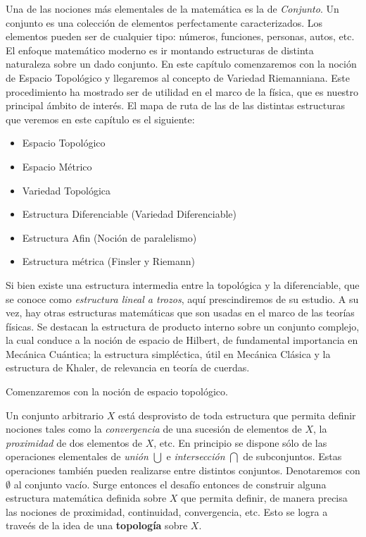 \label{s:3.1}

Una  de  las  nociones m\'as  elementales  de  la  matem\'atica  es la  de  {\it
  Conjunto}.  Un   conjunto  es  una  colecci\'on   de  elementos  perfectamente
caracterizados.  Los   elementos  pueden  ser  de   cualquier  tipo:  n\'umeros,
funciones, personas, autos, etc. El  enfoque matem\'atico moderno es ir montando
estructuras de  distinta naturaleza sobre  un dado conjunto. En  este cap\'itulo
comenzaremos con la noci\'on de Espacio Topol\'ogico y llegaremos al concepto de
Variedad Riemanniana. Este procedimiento ha mostrado ser de utilidad en el marco
de la f\'isica, que es nuestro principal \'ambito de inter\'es.  El mapa de ruta
de  las de  las  distintas estructuras  que  veremos en  este  cap\'itulo es  el
siguiente:
%
\begin{itemize}
\item Espacio Topol\'ogico
\item Espacio M\'etrico
\item Variedad Topol\'ogica
\item Estructura Diferenciable (Variedad Diferenciable)
\item Estructura Afin (Noci\'on de paralelismo)
\item Estructura m\'etrica (Finsler y Riemann)
\end{itemize}

Si  bien   existe  una  estructura   intermedia  entre  la  topol\'ogica   y  la
diferenciable,  que se  conoce  como  {\it estructura  lineal  a trozos},  aquí
prescindiremos de su estudio. A  su vez, hay otras estructuras matem\'aticas que
son usadas en el marco de  las teor\'ias f\'isicas. Se destacan la estructura de
producto interno  sobre un conjunto complejo,  la cual conduce a  la noci\'on de
espacio  de Hilbert,  de fundamental  importancia en  Mec\'anica  Cu\'antica; la
estructura  simpl\'ectica, \'util  en Mec\'anica  Cl\'asica y  la  estructura de
Khaler, de relevancia en teor\'ia de cuerdas.

Comenzaremos con la noci\'on de espacio topol\'ogico.




Un conjunto  arbitrario $X$  est\'a desprovisto de  toda estructura  que permita
definir nociones tales como la {\it convergencia} de una sucesi\'on de elementos
de  $X$, la  {\it proximidad}  de dos  elementos de  $X$, etc.  En  principio se
dispone s\'olo de las operaciones  elementales de {\it uni\'on} $\bigcup$ e {\it
  intersecci\'on} $\bigcap$ de  subconjuntos. Estas operaciones tambi\'en pueden
realizarse entre  distintos conjuntos.  Denotaremos con $\emptyset$  al conjunto
vac\'io.  Surge entonces el  desaf\'io entonces  de construir  alguna estructura
matem\'atica  definida sobre  $X$ que  permita  definir, de  manera precisa  las
nociones  de  proximidad,  continuidad,  convergencia,  etc.  Esto  se  logra  a
trave\'es de la idea de una {\bf topolog\'ia} sobre $X$.

